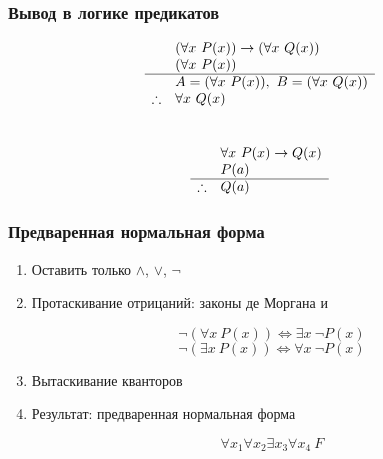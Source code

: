 \documentclass[24pt,pdf,hyperref={unicode}]{beamer}
\begin{document}
\begin{frame}\frametitle{Вывод в логике предикатов}

$$
\begin{array}{l l}
& (\forall x\ P(x))\rightarrow(\forall x\ Q(x)) \\
& (\forall x\ P(x)) \\
\hline
& A=(\forall x\ P(x)),\ B=(\forall x\ Q(x)) \\
\therefore & \forall x\ Q(x)
\end{array}
$$\\[1cm]
$$
\begin{array}{l l}
& \forall x\ P(x)\rightarrow Q(x) \\
& P(a) \\
\hline
\therefore & Q(a)
\end{array}
$$
\end{frame}

\begin{frame}\frametitle{Предваренная нормальная форма}
\begin{enumerate}
\item<1-> Оставить только $\wedge$, $\vee$, $\neg$
\item<2-> Протаскивание отрицаний: законы де Моргана и

$$
\neg(\forall x\ P(x))\Leftrightarrow \exists x\ \neg P(x)
$$
$$
\neg(\exists x\ P(x))\Leftrightarrow \forall x\ \neg P(x)
$$
\item<3-> { Вытаскивание кванторов }

\begin{center}






\end{center}
\item<9-> Результат: предваренная нормальная форма

$$
\forall x_1 \forall x_2 \exists x_3 \forall x_4\ F
$$
\end{enumerate}

\end{frame}
\end{document}
